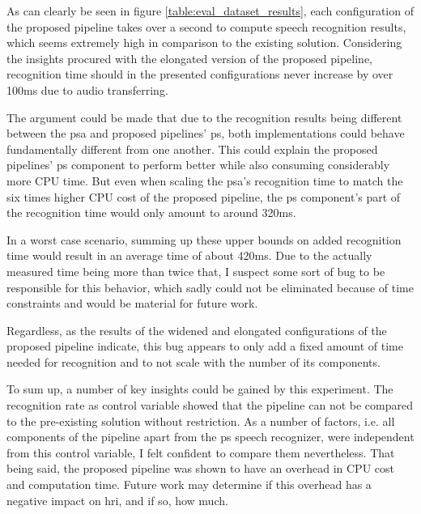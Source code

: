 { %
As can clearly be seen in figure \ref{table:eval_dataset_results}, each configuration of the proposed pipeline takes over a second to compute speech recognition results, which seems extremely high in comparison to the existing solution.
Considering the insights procured with the elongated version of the proposed pipeline, recognition time should in the presented configurations never increase by over 100ms due to audio transferring.

The argument could be made that due to the recognition results being different between the \gls{psa} and proposed pipelines' \gls{ps}, both implementations could behave fundamentally different from one another.
This could explain the proposed pipelines' \gls{ps} component to perform better while also consuming considerably more CPU time.
But even when scaling the \gls{psa}'s recognition time to match the six times higher CPU cost of the proposed pipeline, the \gls{ps} component's part of the recognition time would only amount to around 320ms.

In a worst case scenario, summing up these upper bounds on added recognition time would result in an average time of about 420ms.  
Due to the actually measured time being more than twice that, I suspect some sort of bug to be responsible for this behavior, which sadly could not be eliminated because of time constraints and would be material for future work.

Regardless, as the results of the widened and elongated configurations of the proposed pipeline indicate, this bug appears to only add a fixed amount of time needed for recognition and to not scale with the number of its components. 
}

To sum up, a number of key insights could be gained by this experiment.
The recognition rate as control variable showed that the pipeline can not be compared to the pre-existing solution without restriction.
As a number of factors, i.e. all components of the pipeline apart from the \gls{ps} speech recognizer, were independent from this control variable, I felt confident to compare them nevertheless.
That being said, the proposed pipeline was shown to have an overhead in CPU cost and computation time.
Future work may determine if this overhead has a negative impact on \gls{hri}, and if so, how much.



